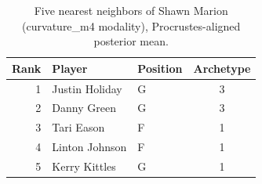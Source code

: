 \begin{table}[htbp]
  \centering\small
  \begin{tabular}{rllc}
    \toprule
    Rank & Player & Position & Archetype \\
    \midrule
    1 & Justin Holiday & G & 3 \\
    2 & Danny Green & G & 3 \\
    3 & Tari Eason & F & 1 \\
    4 & Linton Johnson & F & 1 \\
    5 & Kerry Kittles & G & 1 \\
    \bottomrule
  \end{tabular}
  \caption{Five nearest neighbors of Shawn Marion (curvature_m4 modality), Procrustes-aligned posterior mean.}
  \label{tab:Shawn_Marion_neighbors_curvature_m4}
\end{table}

